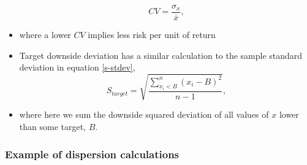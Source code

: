 \documentclass[../notes_compiled.tex]{subfiles}
\begin{document}
\begin{itemize}
\begin{equation}
CV= \frac{\sigma_{x}}{\overline{x}},
\end{equation}
\item[] where a lower $CV$ implies less risk per unit of return
\item Target downside deviation has a similar calculation to the sample standard deviation in equation \ref{s-stdev}, 
\begin{equation}
S_{target} = \sqrt{\frac{\sum_{x_{i}< B}^{n}\left(x_{i}-B\right)^{2}}{n-1}},
\end{equation}
\item[] where here we sum the downside squared deviation of all values of $x$ lower than some target, $B$.
\end{itemize}

\subsubsection{Example of dispersion calculations}
\end{document}
